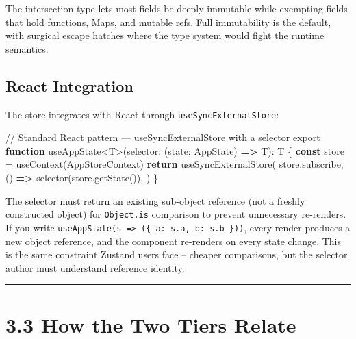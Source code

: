 \documentclass[
  english,
  11pt,
  letterpaper,
]{book}
\newenvironment{Shaded}{\begin{snugshade}}{\end{snugshade}}
\newcommand{\AttributeTok}[1]{\textcolor[rgb]{0.40,0.45,0.13}{#1}}
\newcommand{\CommentTok}[1]{\textcolor[rgb]{0.37,0.37,0.37}{#1}}
\newcommand{\ControlFlowTok}[1]{\textcolor[rgb]{0.00,0.23,0.31}{\textbf{#1}}}
\newcommand{\FunctionTok}[1]{\textcolor[rgb]{0.28,0.35,0.67}{#1}}
\newcommand{\ImportTok}[1]{\textcolor[rgb]{0.00,0.46,0.62}{#1}}
\newcommand{\KeywordTok}[1]{\textcolor[rgb]{0.00,0.23,0.31}{\textbf{#1}}}
\newcommand{\NormalTok}[1]{\textcolor[rgb]{0.00,0.23,0.31}{#1}}
\newcommand{\OperatorTok}[1]{\textcolor[rgb]{0.37,0.37,0.37}{#1}}
\begin{document}
The intersection type lets most fields be deeply immutable while
exempting fields that hold functions, Maps, and mutable refs. Full
immutability is the default, with surgical escape hatches where the type
system would fight the runtime semantics.

\subsection{React Integration}\label{react-integration}

The store integrates with React through \texttt{useSyncExternalStore}:

\begin{Shaded}
\begin{Highlighting}[]
\CommentTok{// Standard React pattern — useSyncExternalStore with a selector}
\ImportTok{export} \KeywordTok{function} \FunctionTok{useAppState}\OperatorTok{\textless{}}\NormalTok{T}\OperatorTok{\textgreater{}}\NormalTok{(selector}\OperatorTok{:}\NormalTok{ (state}\OperatorTok{:}\NormalTok{ AppState) }\KeywordTok{=\textgreater{}}\NormalTok{ T)}\OperatorTok{:}\NormalTok{ T \{}
  \KeywordTok{const}\NormalTok{ store }\OperatorTok{=} \FunctionTok{useContext}\NormalTok{(AppStoreContext)}
  \ControlFlowTok{return} \FunctionTok{useSyncExternalStore}\NormalTok{(}
\NormalTok{    store}\OperatorTok{.}\AttributeTok{subscribe}\OperatorTok{,}
\NormalTok{    () }\KeywordTok{=\textgreater{}} \FunctionTok{selector}\NormalTok{(store}\OperatorTok{.}\FunctionTok{getState}\NormalTok{())}\OperatorTok{,}
\NormalTok{  )}
\NormalTok{\}}
\end{Highlighting}
\end{Shaded}

The selector must return an existing sub-object reference (not a freshly
constructed object) for \texttt{Object.is} comparison to prevent
unnecessary re-renders. If you write
\texttt{useAppState(s\ =\textgreater{}\ (\{\ a:\ s.a,\ b:\ s.b\ \}))},
every render produces a new object reference, and the component
re-renders on every state change. This is the same constraint Zustand
users face -- cheaper comparisons, but the selector author must
understand reference identity.

\begin{center}\rule{0.5\linewidth}{0.5pt}\end{center}

\section{3.3 How the Two Tiers Relate}\label{how-the-two-tiers-relate}
\end{document}
